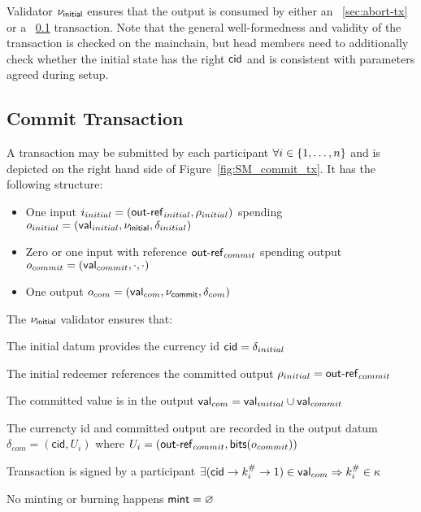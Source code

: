 \noindent Validator $\nu_\mathsf{initial}$ ensures that the output is consumed by either
an \mtxAbort{}~\ref{sec:abort-tx} or a \mtxCom{}~\ref{sec:commit-tx}
transaction. Note that the general well-formedness and validity of the
\mtxInit{} transaction is checked on the mainchain, but head members need to
additionally check whether the initial state has the right $\mathsf{cid}$ and is
consistent with parameters agreed during setup.



\subsection{Commit Transaction}\label{sec:commit-tx}

A \mtxCom{} transaction may be submitted by each participant
$\forall i \in \{1, \ldots, n\}$ and is depicted on the right hand side of
Figure~\ref{fig:SM_commit_tx}. It has the following structure:
\begin{itemize}
  \item One input $i_{initial} = (\mathsf{out\textsf{-}{}ref}_{initial}, \rho_{initial})$
        spending $o_{initial} = (\mathsf{val}_{initial}, \nu_\mathsf{initial}, \delta_{initial})$
  \item Zero or one input with reference $\mathsf{out\textsf{-}{}ref}_{commit}$ spending output
        $o_{commit} = (\mathsf{val}_{commit}, \cdot , \cdot)$
  \item One output $o_{com} = (\mathsf{val}_{com}, \nu_\mathsf{commit}, \delta_{com})$
\end{itemize}

\noindent The $\nu_\mathsf{initial}$ validator ensures that:
\begin{menumerate}
  \item The initial datum provides the currency id $\mathsf{cid} = \delta_{initial}$
  \item The initial redeemer references the committed output $\rho_{initial} = \mathsf{out\textsf{-}{}ref}_{commit}$
  \item The committed value is in the output $\mathsf{val}_{com} = \mathsf{val}_{initial} \cup \mathsf{val}_{commit}$
  \item The currencty id and committed output are recorded in the output datum
  $\delta_{com} = (\mathsf{cid}, U_{i})$ where
  $U_{i} = (\mathsf{out\textsf{-}{}ref}_{commit},\mathsf{bits}(o_{commit}))$
  \item Transaction is signed by a participant $\exists (\mathsf{cid} \rightarrow k^{\#}_{i} \rightarrow 1) \in \mathsf{val}_{com} \Rightarrow k^{\#}_{i} \in \kappa$
  \item No minting or burning happens $\mathsf{mint} = \varnothing$
\end{menumerate}

